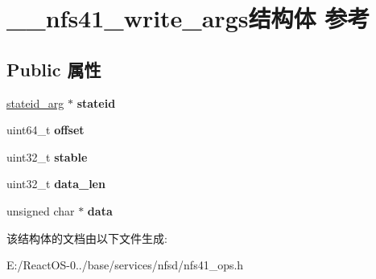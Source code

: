 \hypertarget{struct____nfs41__write__args}{}\section{\+\_\+\+\_\+nfs41\+\_\+write\+\_\+args结构体 参考}
\label{struct____nfs41__write__args}
\subsection*{Public 属性}
\begin{DoxyCompactItemize}
\item 
\mbox{\label{struct____nfs41__write__args_aa6604bb0f0215857a03d070ae375dcf8}} 
\hyperlink{struct____stateid__arg}{stateid\+\_\+arg} $\ast$ {\bfseries stateid}
\item 
\mbox{\label{struct____nfs41__write__args_a96d9f23dc7820f31f7f3b5bf85b8d2f9}} 
uint64\+\_\+t {\bfseries offset}
\item 
\mbox{\label{struct____nfs41__write__args_aa13d904146185b114eca305dc0b4e268}} 
uint32\+\_\+t {\bfseries stable}
\item 
\mbox{\label{struct____nfs41__write__args_a1c9a81d5ee945a1f669963549bb07ab1}} 
uint32\+\_\+t {\bfseries data\+\_\+len}
\item 
\mbox{\label{struct____nfs41__write__args_aa7a61d61339311fa0136f0cf766dc678}} 
unsigned char $\ast$ {\bfseries data}
\end{DoxyCompactItemize}


该结构体的文档由以下文件生成\+:\begin{DoxyCompactItemize}
\item 
E\+:/\+React\+O\+S-\/0../base/services/nfsd/nfs41\+\_\+ops.\+h\end{DoxyCompactItemize}
